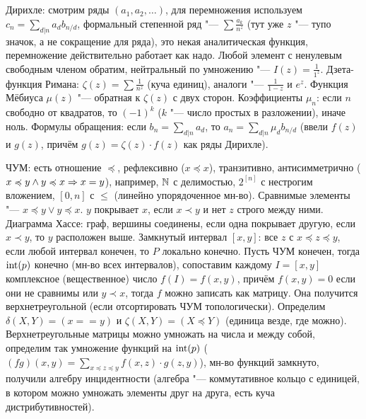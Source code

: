 \section{} %
Дирихле: смотрим ряды $(a_1, a_2, \dots)$, для перемножения используем $c_n=\sum_{d|n} a_db_{n/d}$,
формальный степенной ряд "--- $\sum \frac{a_k}{n^z}$ (тут уже $z$ "--- тупо значок, а не сокращение для ряда),
это некая аналитическая функция, перемножение действительно работает как надо.
Любой элемент с ненулевым свободным членом обратим, нейтральный по умножению "--- $I(z)=\frac{1}{1^z}$.
Дзета-функция Римана: $\zeta(z) = \sum \frac{1}{n^z}$ (куча единиц), аналоги "--- $\frac{1}{1-z}$ и $e^z$.
Функция Мёбиуса $\mu(z)$ "--- обратная к $\zeta(z)$ с двух сторон.
Коэффициенты $\mu_n$: если $n$ свободно от квадратов, то $(-1)^k$ ($k$ "--- число простых в разложении), иначе ноль.
Формулы обращения: если $b_n=\sum_{d|n} a_d$, то $a_n=\sum_{d|n} \mu_d b_{n/d}$ (ввели $f(z)$ и $g(z)$, причём
$g(z)=\zeta(z) \cdot f(z)$ как ряды Дирихле).

ЧУМ: есть отношение $\preccurlyeq$, рефлексивно ($x \preccurlyeq x$), транзитивно, антисимметрично ($x\preccurlyeq y \land y \preccurlyeq x \Rightarrow x=y$),
например, $\mathbb{N}$ с делимостью, $2^{[n]}$ с нестрогим вложением, $[0, n]$ с $\le$ (линейно упорядоченное мн-во).
Сравнимые элементы "--- $x \preccurlyeq y \lor y \preccurlyeq x$.
$y$ покрывает $x$, если $x \prec y$ и нет $z$ строго между ними.
Диаграмма Хассе: граф, вершины соединены, если одна покрывает другую, если $x \prec y$, то $y$ расположен выше.
Замкнутый интервал $[x, y]$: все $z$ с $x \preccurlyeq z \preccurlyeq y$, если любой интервал конечен, то $P$ локально конечно.
Пусть ЧУМ конечен, тогда $\operatorname{int}(p)$ конечно (мн-во всех интервалов), сопоставим каждому $I=[x,y]$ комплексное (вещественное) число
$f(I)=f(x,y)$, причём $f(x,y)=0$ если они не сравнимы или $y \prec x$, тогда $f$ можно записать как матрицу.
Она получится верхнетреугольной (если отсортировать ЧУМ топологически).
Определим $\delta(X, Y)=(x==y)$ и $\zeta(X, Y)=(X \preccurlyeq Y)$ (единица везде, где можно).
Верхнетреугольные матрицы можно умножать на числа и между собой, определим так умножение функций на $\operatorname{int}(p)$
($(fg)(x, y) = \sum_{x \preccurlyeq z \preccurlyeq y} f(x, z) \cdot g(z, y)$), мн-во функций замкнуто,
получили алгебру инцидентности (алгебра "--- коммутативное кольцо с единицей, в котором можно умножать элементы друг на друга, есть куча дистрибутивностей).

